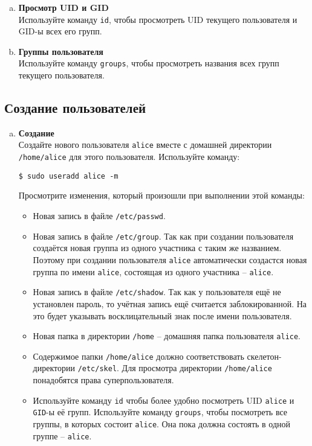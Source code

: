 \documentclass{article}
\begin{document}
\begin{enumerate}[a.]
\item \textbf{Просмотр UID и GID}\\
Используйте команду \texttt{id}, чтобы просмотреть UID текущего пользователя и GID-ы всех его групп.

\item \textbf{Группы пользователя}\\
Используйте команду \texttt{groups}, чтобы просмотреть названия всех групп текущего пользователя.
\end{enumerate}

\subsection{Создание пользователей}
\begin{enumerate}[a.]
\item \textbf{Создание}\\
Создайте нового пользователя \texttt{alice} вместе с домашней директории \texttt{/home/alice} для этого пользователя. Используйте команду:
\begin{lstlisting}
$ sudo useradd alice -m
\end{lstlisting}
Просмотрите изменения, который произошли при выполнении этой команды:
\begin{itemize}
\item Новая запись в файле \texttt{/etc/passwd}.
\item Новая запись в файле \texttt{/etc/group}. Так как при создании пользователя создаётся новая группа из одного участника с таким же названием. Поэтому при создании пользователя \texttt{alice} автоматически создастся новая группа по имени \texttt{alice}, состоящая из одного участника -- \texttt{alice}.
\item Новая запись в файле \texttt{/etc/shadow}. Так как у пользователя ещё не установлен пароль, то учётная запись ещё считается заблокированной. На это будет указывать восклицательный знак после имени пользователя.
\item Новая папка в директории \texttt{/home} -- домашняя папка пользователя \texttt{alice}.
\item Содержимое папки \texttt{/home/alice} должно соответствовать скелетон-директории \texttt{/etc/skel}. Для просмотра директории \texttt{/home/alice} понадобятся права суперпользователя.
\item Используйте команду \texttt{id} чтобы более удобно посмотреть UID \texttt{alice} и \texttt{GID}-ы её групп. Используйте команду \texttt{groups}, чтобы посмотреть все группы, в которых состоит \texttt{alice}. Она пока должна состоять в одной группе -- \texttt{alice}.
\end{itemize}


\end{enumerate}
\end{document}
